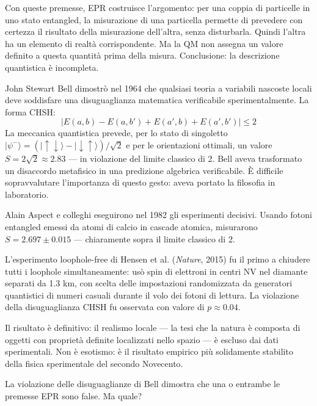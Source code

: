 \documentclass[12pt,a4paper,openany]{book}
\newcommand{\sezione}[1]{\vspace{1.2em}{\large\bfseries #1}\vspace{0.5em}\par}
\begin{document}
Con queste premesse, EPR costruisce l'argomento: per una coppia di particelle in uno stato entangled, la misurazione di una particella permette di prevedere con certezza il risultato della misurazione dell'altra, senza disturbarla. Quindi l'altra ha un elemento di realtà corrispondente. Ma la QM non assegna un valore definito a questa quantità prima della misura. Conclusione: la descrizione quantistica è incompleta.

\sezione{Il teorema di Bell (1964): dalla metafisica all'algebra}

John Stewart Bell dimostrò nel 1964 che qualsiasi teoria a variabili nascoste locali deve soddisfare una disuguaglianza matematica verificabile sperimentalmente. La forma CHSH:
\[
|E(a,b) - E(a,b') + E(a',b) + E(a',b')| \leq 2
\]
La meccanica quantistica prevede, per lo stato di singoletto $|\psi^-\rangle = (|\!\uparrow\downarrow\rangle - |\!\downarrow\uparrow\rangle)/\sqrt{2}$ e per le orientazioni ottimali, un valore $S = 2\sqrt{2} \approx 2.83$ — in violazione del limite classico di 2. Bell aveva trasformato un disaccordo metafisico in una predizione algebrica verificabile. È difficile sopravvalutare l'importanza di questo gesto: aveva portato la filosofia in laboratorio.

\sezione{Gli esperimenti: da Aspect (1982) alla chiusura di tutti i loophole (2015)}

Alain Aspect e colleghi eseguirono nel 1982 gli esperimenti decisivi. Usando fotoni entangled emessi da atomi di calcio in cascade atomica, misurarono $S = 2.697 \pm 0.015$ — chiaramente sopra il limite classico di 2.

L'esperimento loophole-free di Hensen et al. (\textit{Nature}, 2015) fu il primo a chiudere tutti i loophole simultaneamente: usò spin di elettroni in centri NV nel diamante separati da 1.3 km, con scelta delle impostazioni randomizzata da generatori quantistici di numeri casuali durante il volo dei fotoni di lettura. La violazione della disuguaglianza CHSH fu osservata con valore di $p \approx 0.04$.

Il risultato è definitivo: il realismo locale — la tesi che la natura è composta di oggetti con proprietà definite localizzati nello spazio — è escluso dai dati sperimentali. Non è esotismo: è il risultato empirico più solidamente stabilito della fisica sperimentale del secondo Novecento.

\sezione{Cosa significa: le interpretazioni della non-località}

La violazione delle disuguaglianze di Bell dimostra che una o entrambe le premesse EPR sono false. Ma quale?
\end{document}
